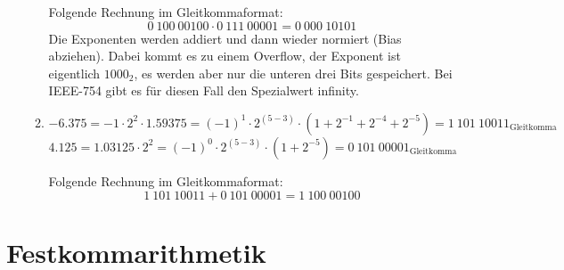 \documentclass[DIN, pagenumber=false, fontsize=11pt, parskip=half]{scrartcl}
\begin{document}
\begin{enumerate}[label=(\alph*)]
\begin{enumerate}[label=\roman*.]
                    Folgende Rechnung im Gleitkommaformat:
                    \begin{equation*}
                        0\ 100\ 00100 \cdot 0\ 111\ 00001 =
                        0\ 000\ 10101
                    \end{equation*}
                    Die Exponenten werden addiert und dann wieder normiert (Bias abziehen). Dabei kommt es zu einem Overflow, 
                    der Exponent ist eigentlich ${1000}_2$, es werden aber nur die unteren drei Bits gespeichert. Bei IEEE-754 gibt es für diesen Fall den
                    Spezialwert infinity.
                \item 
                    \begin{equation*}
                        -6.375 = -1 \cdot 2^2 \cdot 1.59375 = (-1)^1 \cdot 2^{(5-3)} \cdot (1 + 2^{-1} + 2^{-4} + 2^{-5}) 
                        = {1\ 101\ 10011}_\text{Gleitkomma}
                    \end{equation*}
                    \begin{equation*}
                        4.125 = 1.03125 \cdot 2^2 = (-1)^0 \cdot 2^{(5-3)} \cdot (1 + 2^{-5}) = {0\ 101\ 00001}_\text{Gleitkomma}
                    \end{equation*}
                    
                    Folgende Rechnung im Gleitkommaformat:
                    \begin{equation*}
                        {1\ 101\ 10011} + {0\ 101\ 00001} = {1\ 100\ 00100}
                    \end{equation*}
            \end{enumerate}
    \end{enumerate}

    \section{Festkommarithmetik}
    \setcounter{subsection}{3}
\end{document}
